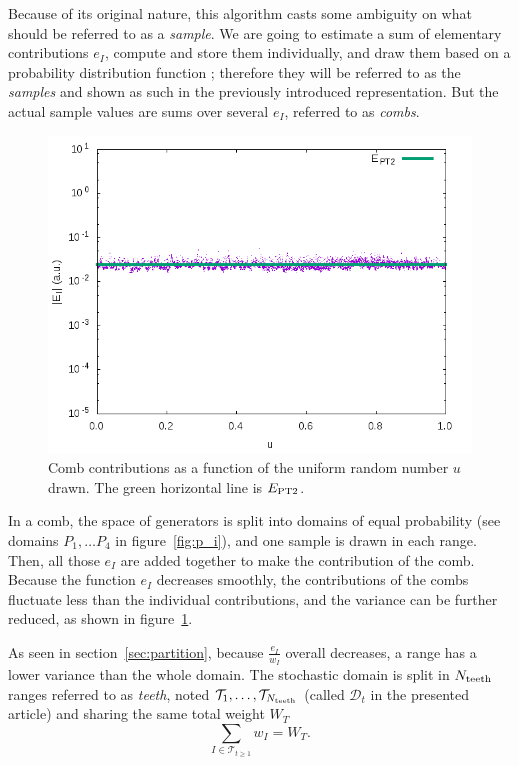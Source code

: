 \documentclass[./thesis.tex]{subfiles}
\begin{document}
Because of its original nature, this algorithm casts some ambiguity on what should be referred to as a \emph{sample}. We are going to estimate a sum of elementary contributions $e_I$, compute and store them individually, and draw them based on a probability distribution function ; therefore they will be referred to as the \emph{samples} and shown as such in the previously introduced representation. But the actual sample values are sums over several $e_I$, referred to as \emph{combs}.

\begin{figure}[h!]
	\begin{center}
		\includegraphics[width=0.7\columnwidth]{figures/pt2/comb_variance}
	\end{center}
		\caption{Comb contributions as a function of the uniform random number $u$ drawn. The green horizontal line is $E_\text{PT2}$.}
		\label{fig:ei_comb}
\end{figure}
In a comb, the space of generators is split into domains of equal probability (see
domains $P_1, \dots P_4$ in figure~\ref{fig:p_i}), and
one sample is drawn in each range. Then, all those $e_I$ are added together to make the contribution of the comb. Because the function $e_I$ decreases smoothly, the contributions of the combs fluctuate less than the individual contributions, and the variance can be further reduced, as shown in figure~\ref{fig:ei_comb}.

As seen in section~\ref{sec:partition}, because $\frac{e_I}{w_I}$ overall decreases, a range has a lower variance than the whole domain. The stochastic domain is split in $N_\text{teeth}$ ranges referred to as \emph{teeth}, noted $\mathcal{T}_1,\ldots,\mathcal{T}_{N_\text{teeth}}$ (called $\mathcal{D}_t$ in the presented article) and sharing the same total weight $W_T$
\begin{equation}
\sum_{I \in \mathcal{T}_{t \geq 1}} w_I=W_T.
\end{equation}
\end{document}

